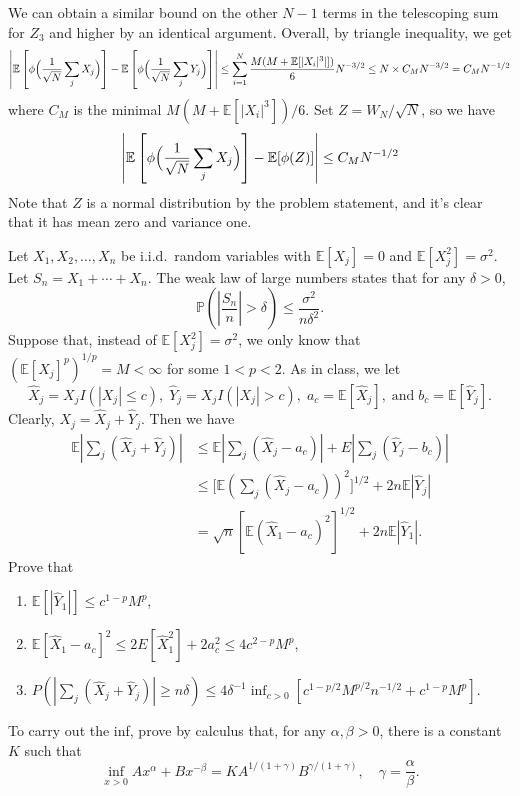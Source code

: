 \documentclass[11pt,letterpaper]{article}
\def\E{\mathbb{E}}
\begin{document}
\begin{solution}
\quad We can obtain a similar bound on the other $N-1$ terms in the telescoping sum for $Z_3$ and higher by an identical argument. Overall, by triangle inequality, we get
\[
\left|\E\left[\phi\Bigl(\frac1{\sqrt{N}}\sum_j X_j\Bigr)\right] - \E\left[\phi\Bigl(\frac1{\sqrt{N}}\sum_j Y_j\Bigr)\right]\right| \leq \sum^N_{i=1} \frac{M(M+\E[|X_i|^3|])}{6}N^{-3/2}\leq N \times C_MN^{-3/2} = C_M N^{-1/2}
\]
where $C_M$ is the minimal $M(M+\E[|X_i|^3]) /6$. Set $Z = W_N /\sqrt{N}$, so we have
\[\left|\E\left[\phi\Bigl(\frac1{\sqrt{N}}\sum_j X_j\Bigr)\right] - \E[\phi(Z)]\right| \leq C_M N^{-1/2}\]
Note that $Z$ is a normal distribution by the problem statement, and it's clear that it has mean zero and variance one.
\end{solution}

\pagebreak
\begin{problem}
    Let $X_1,X_2,\dots,X_n$ be i.i.d.\ random variables with $\E[X_j] = 0$ and $\E[X_j^2]=\sigma^2$. Let $S_n = X_1+\cdots+X_n$. The weak law of large numbers states that for any $\delta > 0$,
    \begin{equation}
        \mathbb{P}\left(\left|\frac{S_n}{n}\right| > \delta\right) \leq \frac{\sigma^2}{n\delta^2}.
    \end{equation}
    Suppose that, instead of $\E[X_j^2]=\sigma^2$, we only know that $(\E[X_j]^p)^{1/p}=M< \infty$ for some $1 < p < 2$. As in class, we let
    \[
    \widehat{X}_j = X_jI(|X_j| \leq c),\;\widehat{Y}_j = X_jI(|X_j| > c),\;a_c = \E[\widehat{X}_j],\;\text{and}\;b_c = \E[\widehat{Y}_j].
    \]
    Clearly, $X_j = \widehat{X}_j+\widehat{Y}_j$. Then we have
    \begin{align*}
        \E\left|\sum_j(\widehat{X}_j+\widehat{Y}_j)\right| &\leq \E\left|\sum_j(\widehat{X}_j-a_c)\right|+E\left|\sum_j(\widehat{Y}_j-b_c)\right| \\
        &\leq \biggl[\E\left(\sum_j(\widehat{X}_j-a_c)\right)^2\biggr]^{1/2}+2n\E|\widehat{Y}_j| \\
        &= \sqrt{n}\left[\E(\widehat{X}_1-a_c)^2\right]^{1/2}+2n\E|\widehat{Y}_1|.
    \end{align*}
    Prove that
    \begin{enumerate}
        \item $\E[|\widehat{Y}_1|] \leq c^{1-p}M^p$,
        \item $\E[\widehat{X}_1-a_c]
        ^2 \leq 2E[\widehat{X}_1^2] + 2a_c^2 \leq 4c^{2-p}M^p$,
        \item $P\left(\left|\sum_j (\widehat{X}_j+\widehat{Y}_j)\right|\geq n\delta\right) \leq 4\delta^{-1}\inf_{c > 0}[c^{1-p/2}M^{p/2}n^{-1/2}+c^{1-p}M^p]$.
    \end{enumerate}
    To carry out the inf, prove by calculus that, for any $\alpha,\beta > 0$, there is a constant $K$ such that
    \[
    \inf_{x > 0} Ax^\alpha+Bx^{-\beta} = KA^{1/(1+\gamma)}B^{\gamma/(1+\gamma)},\quad\gamma = \frac\alpha\beta.
    \]
\end{problem}
\end{document}
